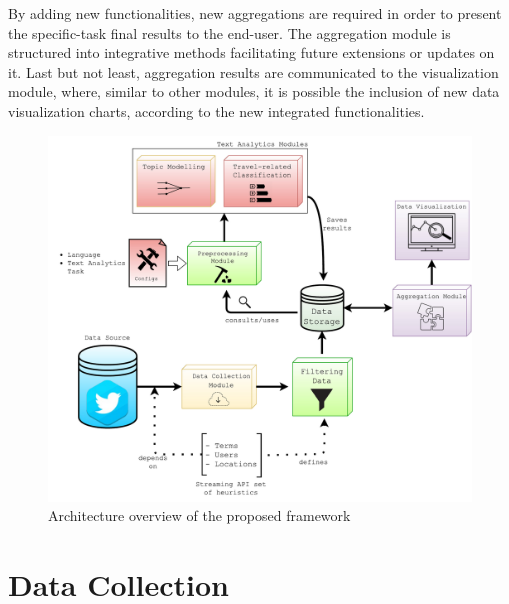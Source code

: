 By adding new functionalities, new aggregations are required in order to present the specific-task final results to the end-user. The aggregation module is structured into integrative methods facilitating future extensions or updates on it. Last but not least, aggregation results are communicated to the visualization module, where, similar to other modules, it is possible the inclusion of new data visualization charts, according to the new integrated functionalities.

\begin{figure}[htbp]
	\centering
	\includegraphics[width=\textwidth]{figures/architecture.pdf}
	\caption[Framework Architecture Overview]{Architecture overview of the proposed framework}
	\label{fig:architecture}
\end{figure}

\section{Data Collection}\label{sec:data_collection}

